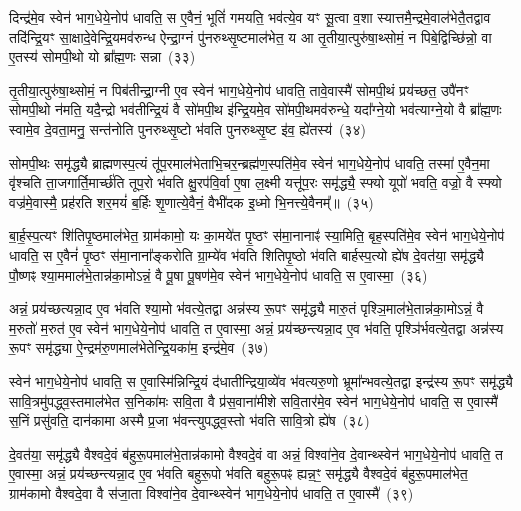 दिन्द्र॑मे॒व स्वेन॑ भाग॒धेये॒नोप॑ धावति॒ स ए॒वैनं॒ भूतिं॑ गमयति॒ भव॑त्ये॒व यꣳ सू॒त्वा व॒शा स्यात्तमै॒न्द्रमे॒वाल॑भेतै॒तद्वाव तदि॑न्द्रि॒यꣳ सा॒क्षादे॒वेन्द्रि॒यमव॑रुन्ध ऐन्द्रा॒ग्नं पु॑नरुथ्सृ॒ष्टमा\-ल॑भेत॒ य आ तृ॒तीया॒त्पुरु॑षा॒थ्सोमं॒ न पिबे॒द्विच्छि॑न्नो॒ वा ए॒तस्य॑ सोमपी॒थो यो ब्रा᳚ह्म॒णः सन्ना~(३३)

तृ॒तीया॒त्पुरु॑षा॒थ्सोमं॒ न पिब॑तीन्द्रा॒ग्नी ए॒व स्वेन॑ भाग॒धेये॒नोप॑ धावति॒ तावे॒वास्मै॑ सोमपी॒थं प्रय॑च्छत॒ उपै॑नꣳ सोमपी॒थो न॑मति॒ यदै॒न्द्रो भव॑तीन्द्रि॒यं वै सो॑मपी॒थ इ॑न्द्रि॒यमे॒व सो॑मपी॒थमव॑\-रुन्धे॒ यदा᳚ग्ने॒यो भव॑त्याग्ने॒यो वै ब्रा᳚ह्म॒णः स्वामे॒व दे॒वता॒मनु॒ सन्त॑नोति पुनरुथ्सृ॒ष्टो भ॑वति पुनरुथ्सृ॒ष्ट इ॑व॒ ह्ये॑तस्य॑~(३४)

सोमपी॒थः समृ॑द्ध्यै ब्राह्मणस्प॒त्यं तू॑प॒रमाल॑भेताभि॒\-चर॒न्ब्रह्म॑ण॒स्पति॑मे॒व स्वेन॑ भाग॒धेये॒नोप॑ धावति॒ तस्मा॑ ए॒वैन॒मा वृ॑श्चति ता॒जगार्ति॒मार्च्छ॑ति तूप॒रो भ॑वति क्षु॒रप॑वि॒र्वा ए॒षा ल॒क्ष्मी यत्तू॑प॒रः समृ॑द्ध्यै॒ स्फ्यो यूपो॑ भवति॒ वज्रो॒ वै स्फ्यो वज्र॑मे॒वास्मै॒ प्रह॑रति शर॒मयं॑ ब॒र्\mbox{}हिः शृ॒णात्ये॒वैनं॒ वैभी॑दक इ॒ध्मो भि॒नत्त्ये॒वैनम्᳚॥~(३५)

{}%

बा॒र्\mbox{}ह॒स्प॒त्यꣳ शि॑तिपृ॒ष्ठमा\-ल॑भेत॒ ग्राम॑कामो॒ यः का॒मये॑त पृ॒ष्ठꣳ स॑मा॒नानाꣴ॑ स्या॒मिति॒ बृह॒स्पति॑मे॒व स्वेन॑ भाग॒धेये॒नोप॑ धावति॒ स ए॒वैनं॑ पृ॒ष्ठꣳ स॑मा॒नाना᳚ङ्करोति ग्रा॒म्ये॑व भ॑वति शितिपृ॒ष्ठो भ॑वति बार्\mbox{}हस्प॒त्यो ह्ये॑ष दे॒वत॑या॒ समृ॑द्ध्यै पौ॒ष्णꣴ श्या॒ममाल॑भे॒तान्न॑का॒मो\-ऽन्नं॒ वै पू॒षा पू॒षण॑मे॒व स्वेन॑ भाग॒धेये॒नोप॑ धावति॒ स ए॒वास्मा॒~(३६)

अन्नं॒ प्रय॑च्छत्यन्ना॒द ए॒व भ॑वति श्या॒मो भ॑वत्ये॒तद्वा अन्न॑स्य रू॒पꣳ समृ॑द्ध्यै मारु॒तं पृश्ञि॒माल॑भे॒तान्न॑का॒मो\-ऽन्नं॒ वै म॒रुतो॑ म॒रुत॑ ए॒व स्वेन॑ भाग॒धेये॒नोप॑ धावति॒ त ए॒वास्मा॒ अन्नं॒ प्रय॑च्छन्त्यन्ना॒द ए॒व भ॑वति॒ पृश्ञि॑र्भवत्ये॒तद्वा अन्न॑स्य रू॒पꣳ समृ॑द्ध्या ऐ॒न्द्रम॑रु॒णमाल॑भेतेन्द्रि॒यका॑म॒ इन्द्र॑मे॒व~(३७)

स्वेन॑ भाग॒धेये॒नोप॑ धावति॒ स ए॒वास्मि॑न्निन्द्रि॒यं द॑धातीन्द्रिया॒\-व्ये॑व भ॑वत्यरु॒णो भ्रूमा᳚न्भवत्ये॒तद्वा इन्द्र॑स्य रू॒पꣳ समृ॑द्ध्यै सावि॒त्र\-मु॑प\-द्ध्व॒स्तमाल॑भेत स॒निका॑मः सवि॒ता वै प्र॑स॒वाना॑मीशे सवि॒तार॑मे॒व स्वेन॑ भाग॒धेये॒नोप॑ धावति॒ स ए॒वास्मै॑ स॒निं प्रसु॑वति॒ दान॑कामा अस्मै प्र॒जा भ॑वन्त्युपद्ध्व॒स्तो भ॑वति सावि॒त्रो ह्ये॑ष~(३८)

दे॒वत॑या॒ समृ॑द्ध्यै वैश्वदे॒वं ब॑हुरू॒पमाल॑भे॒तान्न॑कामो वैश्वदे॒वं वा अन्नं॒ विश्वा॑ने॒व दे॒वान्थ्स्वेन॑ भाग॒धेये॒नोप॑ धावति॒ त ए॒वास्मा॒ अन्नं॒ प्रय॑च्छन्त्यन्ना॒द ए॒व भ॑वति बहुरू॒पो भ॑वति बहुरू॒पꣴ ह्यन्न॒ꣳ॒ समृ॑द्ध्यै वैश्वदे॒वं ब॑हुरू॒पमा\-ल॑भेत॒ ग्राम॑कामो वैश्वदे॒वा वै स॑जा॒ता विश्वा॑ने॒व दे॒वान्थ्स्वेन॑ भाग॒धेये॒नोप॑ धावति॒ त ए॒वास्मै॑~(३९)

